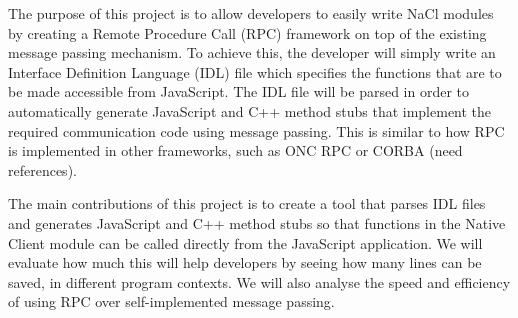 The purpose of this project is to allow developers to easily write NaCl modules by creating a Remote Procedure Call (RPC) framework on top of the existing message passing mechanism. To achieve this, the developer will simply write an Interface Definition Language (IDL) file which specifies the functions that are to be made accessible from JavaScript. The IDL file will be parsed in order to automatically generate JavaScript and C++ method stubs that implement the required communication code using message passing. This is similar to how RPC is implemented in other frameworks, such as ONC RPC or CORBA (need references).

The main contributions of this project is to create a tool that parses IDL files and generates JavaScript and C++ method stubs so that functions in the Native Client module can be called directly from the JavaScript application. We will evaluate how much this will help developers by seeing how many lines can be saved, in different program contexts. We will also analyse the speed and efficiency of using RPC over self-implemented message passing. 